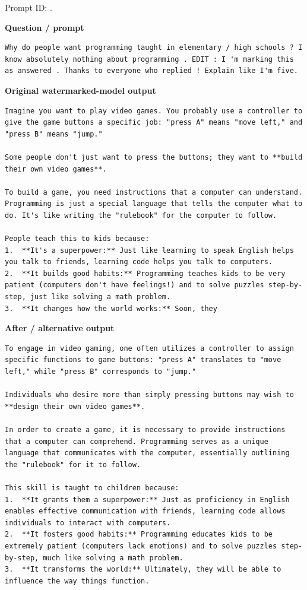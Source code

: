 Prompt ID:
\texttt{}.

\textbf{Question / prompt}

\begin{Verbatim}
Why do people want programming taught in elementary / high schools ? I know absolutely nothing about programming . EDIT : I 'm marking this as answered . Thanks to everyone who replied ! Explain like I'm five.
\end{Verbatim}

\textbf{Original watermarked-model output}

\begin{Verbatim}
Imagine you want to play video games. You probably use a controller to give the game buttons a specific job: "press A" means "move left," and "press B" means "jump."

Some people don't just want to press the buttons; they want to **build their own video games**.

To build a game, you need instructions that a computer can understand. Programming is just a special language that tells the computer what to do. It's like writing the "rulebook" for the computer to follow.

People teach this to kids because:
1.  **It's a superpower:** Just like learning to speak English helps you talk to friends, learning code helps you talk to computers.
2.  **It builds good habits:** Programming teaches kids to be very patient (computers don't have feelings!) and to solve puzzles step-by-step, just like solving a math problem.
3.  **It changes how the world works:** Soon, they
\end{Verbatim}

\textbf{After / alternative output}

\begin{Verbatim}
To engage in video gaming, one often utilizes a controller to assign specific functions to game buttons: "press A" translates to "move left," while "press B" corresponds to "jump."

Individuals who desire more than simply pressing buttons may wish to **design their own video games**.

In order to create a game, it is necessary to provide instructions that a computer can comprehend. Programming serves as a unique language that communicates with the computer, essentially outlining the "rulebook" for it to follow.

This skill is taught to children because:
1.  **It grants them a superpower:** Just as proficiency in English enables effective communication with friends, learning code allows individuals to interact with computers.
2.  **It fosters good habits:** Programming educates kids to be extremely patient (computers lack emotions) and to solve puzzles step-by-step, much like solving a math problem.
3.  **It transforms the world:** Ultimately, they will be able to influence the way things function.
\end{Verbatim}

